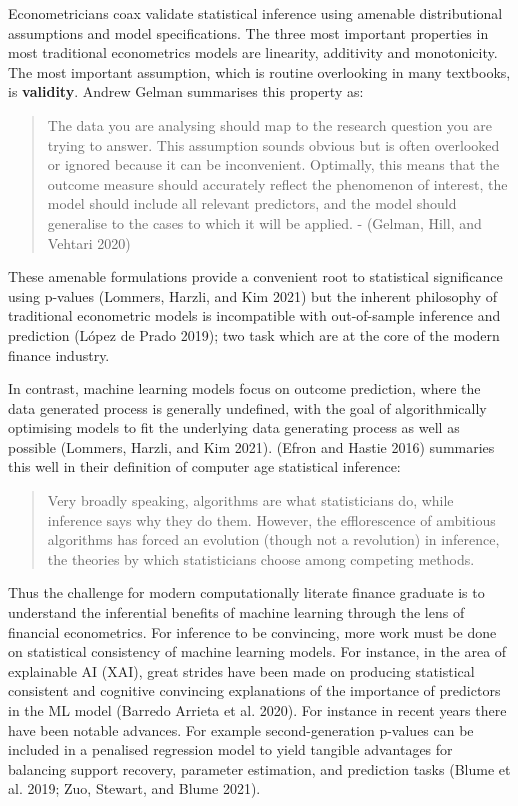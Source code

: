 \documentclass{article}
\begin{document}
Econometricians coax validate statistical inference using amenable
distributional assumptions and model specifications. The three most
important properties in most traditional econometrics models are
linearity, additivity and monotonicity. The most important assumption,
which is routine overlooking in many textbooks, is \textbf{validity}.
Andrew Gelman summarises this property as:

\begin{quote}
The data you are analysing should map to the research question you are
trying to answer. This assumption sounds obvious but is often overlooked
or ignored because it can be inconvenient. Optimally, this means that
the outcome measure should accurately reflect the phenomenon of
interest, the model should include all relevant predictors, and the
model should generalise to the cases to which it will be applied. -
(Gelman, Hill, and Vehtari 2020)
\end{quote}

These amenable formulations provide a convenient root to statistical
significance using p-values (Lommers, Harzli, and Kim 2021) but the
inherent philosophy of traditional econometric models is incompatible
with out-of-sample inference and prediction (López de Prado 2019); two
task which are at the core of the modern finance industry.

In contrast, machine learning models focus on outcome prediction, where
the data generated process is generally undefined, with the goal of
algorithmically optimising models to fit the underlying data generating
process as well as possible (Lommers, Harzli, and Kim 2021). (Efron and
Hastie 2016) summaries this well in their definition of computer age
statistical inference:

\begin{quote}
Very broadly speaking, algorithms are what statisticians do, while
inference says why they do them. However, the efflorescence of ambitious
algorithms has forced an evolution (though not a revolution) in
inference, the theories by which statisticians choose among competing
methods.
\end{quote}

Thus the challenge for modern computationally literate finance graduate
is to understand the inferential benefits of machine learning through
the lens of financial econometrics. For inference to be convincing, more
work must be done on statistical consistency of machine learning models.
For instance, in the area of explainable AI (XAI), great strides have
been made on producing statistical consistent and cognitive convincing
explanations of the importance of predictors in the ML model (Barredo
Arrieta et al. 2020). For instance in recent years there have been
notable advances. For example second-generation p-values can be included
in a penalised regression model to yield tangible advantages for
balancing support recovery, parameter estimation, and prediction tasks
(Blume et al. 2019; Zuo, Stewart, and Blume 2021).
\end{document}
